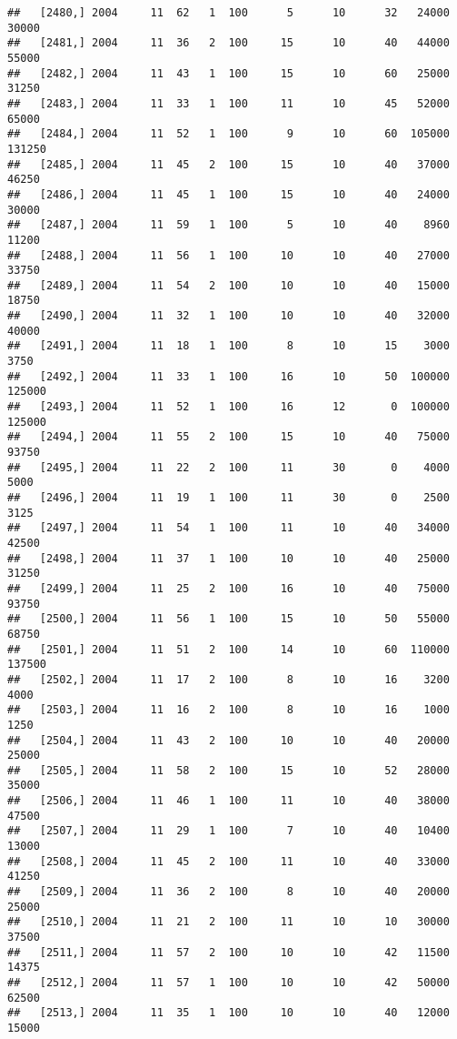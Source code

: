 \documentclass{article}\usepackage[]{graphicx}\usepackage[]{color}
\makeatletter
\newenvironment{kframe}{%
 \def\at@end@of@kframe{}%
 \ifinner\ifhmode%
  \def\at@end@of@kframe{\end{minipage}}%
  \begin{minipage}{\columnwidth}%
 \fi\fi%
 \def\FrameCommand##1{\hskip\@totalleftmargin \hskip-\fboxsep
 \colorbox{shadecolor}{##1}\hskip-\fboxsep
     \hskip-\linewidth \hskip-\@totalleftmargin \hskip\columnwidth}%
 \MakeFramed {\advance\hsize-\width
   \@totalleftmargin\z@ \linewidth\hsize
   \@setminipage}}%
 {\par\unskip\endMakeFramed%
 \at@end@of@kframe}
\newenvironment{knitrout}{}{} %
\makeatother
\begin{document}
\begin{knitrout}
\begin{kframe}
\begin{verbatim}
##   [2480,] 2004     11  62   1  100      5      10      32   24000   30000
##   [2481,] 2004     11  36   2  100     15      10      40   44000   55000
##   [2482,] 2004     11  43   1  100     15      10      60   25000   31250
##   [2483,] 2004     11  33   1  100     11      10      45   52000   65000
##   [2484,] 2004     11  52   1  100      9      10      60  105000  131250
##   [2485,] 2004     11  45   2  100     15      10      40   37000   46250
##   [2486,] 2004     11  45   1  100     15      10      40   24000   30000
##   [2487,] 2004     11  59   1  100      5      10      40    8960   11200
##   [2488,] 2004     11  56   1  100     10      10      40   27000   33750
##   [2489,] 2004     11  54   2  100     10      10      40   15000   18750
##   [2490,] 2004     11  32   1  100     10      10      40   32000   40000
##   [2491,] 2004     11  18   1  100      8      10      15    3000    3750
##   [2492,] 2004     11  33   1  100     16      10      50  100000  125000
##   [2493,] 2004     11  52   1  100     16      12       0  100000  125000
##   [2494,] 2004     11  55   2  100     15      10      40   75000   93750
##   [2495,] 2004     11  22   2  100     11      30       0    4000    5000
##   [2496,] 2004     11  19   1  100     11      30       0    2500    3125
##   [2497,] 2004     11  54   1  100     11      10      40   34000   42500
##   [2498,] 2004     11  37   1  100     10      10      40   25000   31250
##   [2499,] 2004     11  25   2  100     16      10      40   75000   93750
##   [2500,] 2004     11  56   1  100     15      10      50   55000   68750
##   [2501,] 2004     11  51   2  100     14      10      60  110000  137500
##   [2502,] 2004     11  17   2  100      8      10      16    3200    4000
##   [2503,] 2004     11  16   2  100      8      10      16    1000    1250
##   [2504,] 2004     11  43   2  100     10      10      40   20000   25000
##   [2505,] 2004     11  58   2  100     15      10      52   28000   35000
##   [2506,] 2004     11  46   1  100     11      10      40   38000   47500
##   [2507,] 2004     11  29   1  100      7      10      40   10400   13000
##   [2508,] 2004     11  45   2  100     11      10      40   33000   41250
##   [2509,] 2004     11  36   2  100      8      10      40   20000   25000
##   [2510,] 2004     11  21   2  100     11      10      10   30000   37500
##   [2511,] 2004     11  57   2  100     10      10      42   11500   14375
##   [2512,] 2004     11  57   1  100     10      10      42   50000   62500
##   [2513,] 2004     11  35   1  100     10      10      40   12000   15000

\end{verbatim}
\end{kframe}
\end{knitrout}
\end{document}
